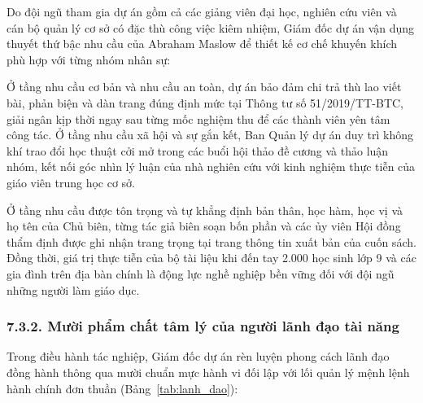 Do đội ngũ tham gia dự án gồm cả các giảng viên đại học, nghiên cứu viên và cán bộ quản lý cơ sở có đặc thù công việc kiêm nhiệm, Giám đốc dự án vận dụng thuyết thứ bậc nhu cầu của Abraham Maslow để thiết kế cơ chế khuyến khích phù hợp với từng nhóm nhân sự:

Ở tầng nhu cầu cơ bản và nhu cầu an toàn, dự án bảo đảm chi trả thù lao viết bài, phản biện và dàn trang đúng định mức tại Thông tư số 51/2019/TT-BTC, giải ngân kịp thời ngay sau từng mốc nghiệm thu để các thành viên yên tâm công tác. Ở tầng nhu cầu xã hội và sự gắn kết, Ban Quản lý dự án duy trì không khí trao đổi học thuật cởi mở trong các buổi hội thảo đề cương và thảo luận nhóm, kết nối góc nhìn lý luận của nhà nghiên cứu với kinh nghiệm thực tiễn của giáo viên trung học cơ sở.

Ở tầng nhu cầu được tôn trọng và tự khẳng định bản thân, học hàm, học vị và họ tên của Chủ biên, từng tác giả biên soạn bốn phần và các ủy viên Hội đồng thẩm định được ghi nhận trang trọng tại trang thông tin xuất bản của cuốn sách. Đồng thời, giá trị thực tiễn của bộ tài liệu khi đến tay 2.000 học sinh lớp 9 và các gia đình trên địa bàn chính là động lực nghề nghiệp bền vững đối với đội ngũ những người làm giáo dục.

\subsubsection{7.3.2. Mười phẩm chất tâm lý của người lãnh đạo tài năng}

Trong điều hành tác nghiệp, Giám đốc dự án rèn luyện phong cách lãnh đạo đồng hành thông qua mười chuẩn mực hành vi đối lập với lối quản lý mệnh lệnh hành chính đơn thuần (Bảng~\ref{tab:lanh_dao}):

